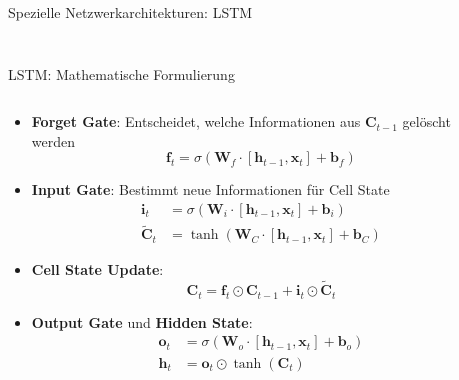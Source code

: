 \documentclass[aspectratio=1610, xcolor=dvipsnames, 9pt]{beamer}
\begin{document}
\begin{frame}{Spezielle Netzwerkarchitekturen: LSTM}
\begin{columns}
\begin{column}{0.4\textwidth}
\begin{figure}
                \end{figure}

           \end{column}
        \end{columns}
      \end{frame}
      
            
      \begin{frame}{LSTM: Mathematische Formulierung}
        \begin{columns}
          \begin{column}{0.6\textwidth}
            \begin{itemize}              
              \item \textbf{Forget Gate}: Entscheidet, welche Informationen aus $\mathbf{C}_{t-1}$ gelöscht werden
              \begin{equation}
                \mathbf{f}_t = \sigma(\mathbf{W}_f \cdot [\mathbf{h}_{t-1}, \mathbf{x}_t] + \mathbf{b}_f)
              \end{equation}
              \item \textbf{Input Gate}: Bestimmt neue Informationen für Cell State
              \begin{align}
                \mathbf{i}_t &= \sigma(\mathbf{W}_i \cdot [\mathbf{h}_{t-1}, \mathbf{x}_t] + \mathbf{b}_i) \\
                \tilde{\mathbf{C}}_t &= \tanh(\mathbf{W}_C \cdot [\mathbf{h}_{t-1}, \mathbf{x}_t] + \mathbf{b}_C)
              \end{align}
              \item \textbf{Cell State Update}:
              \begin{equation}
                \mathbf{C}_t = \mathbf{f}_t \odot \mathbf{C}_{t-1} + \mathbf{i}_t \odot \tilde{\mathbf{C}}_t
              \end{equation}
              \item \textbf{Output Gate} und \textbf{Hidden State}:
              \begin{align}
                \mathbf{o}_t &= \sigma(\mathbf{W}_o \cdot [\mathbf{h}_{t-1}, \mathbf{x}_t] + \mathbf{b}_o) \\
                \mathbf{h}_t &= \mathbf{o}_t \odot \tanh(\mathbf{C}_t)
              \end{align}
            \end{itemize}
          \end{column}
           \begin{column}{0.4\textwidth}

\end{column}
\end{columns}
\end{frame}
\end{document}
